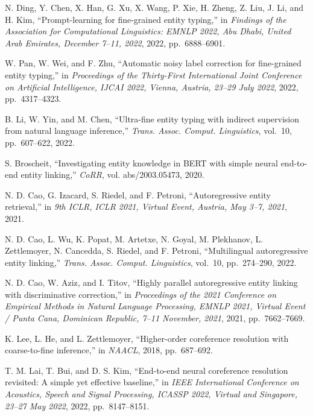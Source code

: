 \begin{enumerate}[leftmargin=2em,label={[\arabic*]}]
\item N. Ding, Y. Chen, X. Han, G. Xu, X. Wang, P. Xie, H. Zheng, Z. Liu, J. Li, and H. Kim, ``Prompt-learning for fine-grained entity typing,'' in \textit{Findings of the Association for Computational Linguistics: EMNLP 2022, Abu Dhabi, United Arab Emirates, December 7--11, 2022}, 2022, pp.~6888--6901.

\item W. Pan, W. Wei, and F. Zhu, ``Automatic noisy label correction for fine-grained entity typing,'' in \textit{Proceedings of the Thirty-First International Joint Conference on Artificial Intelligence, IJCAI 2022, Vienna, Austria, 23--29 July 2022}, 2022, pp.~4317--4323.

\item B. Li, W. Yin, and M. Chen, ``Ultra-fine entity typing with indirect supervision from natural language inference,'' \textit{Trans. Assoc. Comput. Linguistics}, vol.~10, pp.~607--622, 2022.

\item S. Broscheit, ``Investigating entity knowledge in BERT with simple neural end-to-end entity linking,'' \textit{CoRR}, vol. abs/2003.05473, 2020.

\item N. D. Cao, G. Izacard, S. Riedel, and F. Petroni, ``Autoregressive entity retrieval,'' in \textit{9th ICLR, ICLR 2021, Virtual Event, Austria, May 3--7, 2021}, 2021.

\item N. D. Cao, L. Wu, K. Popat, M. Artetxe, N. Goyal, M. Plekhanov, L. Zettlemoyer, N. Cancedda, S. Riedel, and F. Petroni, ``Multilingual autoregressive entity linking,'' \textit{Trans. Assoc. Comput. Linguistics}, vol.~10, pp.~274--290, 2022.

\item N. D. Cao, W. Aziz, and I. Titov, ``Highly parallel autoregressive entity linking with discriminative correction,'' in \textit{Proceedings of the 2021 Conference on Empirical Methods in Natural Language Processing, EMNLP 2021, Virtual Event / Punta Cana, Dominican Republic, 7--11 November, 2021}, 2021, pp.~7662--7669.

\item K. Lee, L. He, and L. Zettlemoyer, ``Higher-order coreference resolution with coarse-to-fine inference,'' in \textit{NAACL}, 2018, pp.~687--692.

\item T. M. Lai, T. Bui, and D. S. Kim, ``End-to-end neural coreference resolution revisited: A simple yet effective baseline,'' in \textit{IEEE International Conference on Acoustics, Speech and Signal Processing, ICASSP 2022, Virtual and Singapore, 23--27 May 2022}, 2022, pp.~8147--8151.


\end{enumerate}
